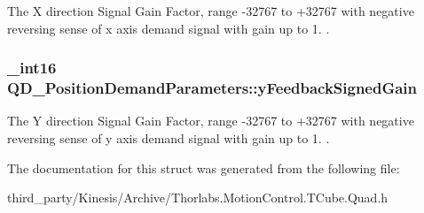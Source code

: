 The X direction Signal Gain Factor, range -\/32767 to +32767 with negative reversing sense of x axis demand signal with gain up to 1. . 

\subsubsection[{\texorpdfstring{y\+Feedback\+Signed\+Gain}{yFeedbackSignedGain}}]{\setlength{\rightskip}{0pt plus 5cm}\+\_\+int16 Q\+D\+\_\+\+Position\+Demand\+Parameters\+::y\+Feedback\+Signed\+Gain}\hypertarget{struct_q_d___position_demand_parameters_ac3bd6103f0b102e8802fedd565939602}{}\label{struct_q_d___position_demand_parameters_ac3bd6103f0b102e8802fedd565939602}


The Y direction Signal Gain Factor, range -\/32767 to +32767 with negative reversing sense of y axis demand signal with gain up to 1. . 



The documentation for this struct was generated from the following file\+:\begin{DoxyCompactItemize}
\item 
third\+\_\+party/\+Kinesis/\+Archive/Thorlabs.\+Motion\+Control.\+T\+Cube.\+Quad.\+h\end{DoxyCompactItemize}
